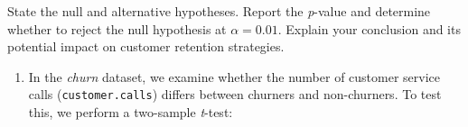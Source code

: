 \documentclass[
  11pt,
]{book}
\makeatletter
\newenvironment{Shaded}{}{}
\newcommand{\AttributeTok}[1]{#1}
\newcommand{\DecValTok}[1]{#1}
\newcommand{\FloatTok}[1]{#1}
\newcommand{\FunctionTok}[1]{#1}
\newcommand{\NormalTok}[1]{#1}
\newcommand{\OtherTok}[1]{\textcolor[rgb]{0.39,0.39,0.39}{#1}}
\newcommand{\SpecialCharTok}[1]{\textcolor[rgb]{0.39,0.39,0.39}{#1}}
\newcommand{\StringTok}[1]{\textcolor[rgb]{0.39,0.39,0.39}{#1}}
\providecommand{\tightlist}{%
  \setlength{\itemsep}{0pt}\setlength{\parskip}{0pt}}
\newenvironment{kframe}{%
\medskip{}
\setlength{\fboxsep}{.8em}
 \def\at@end@of@kframe{}%
 \ifinner\ifhmode%
  \def\at@end@of@kframe{\end{minipage}}%
  \begin{minipage}{\columnwidth}%
 \fi\fi%
 \def\FrameCommand##1{\hskip\@totalleftmargin \hskip-\fboxsep
 \colorbox{shadecolor}{##1}\hskip-\fboxsep
     \hskip-\linewidth \hskip-\@totalleftmargin \hskip\columnwidth}%
 \MakeFramed {\advance\hsize-\width
   \@totalleftmargin\z@ \linewidth\hsize
   \@setminipage}}%
 {\par\unskip\endMakeFramed%
 \at@end@of@kframe}
\renewenvironment{Shaded}{\begin{kframe}}{\end{kframe}}
\theoremstyle{definition}
\theoremstyle{definition}
\theoremstyle{definition}
\theoremstyle{definition}
\theoremstyle{remark}
\makeatother
\begin{document}
\begin{Shaded}
\end{Shaded}

State the null and alternative hypotheses. Report the \emph{p}-value and determine whether to reject the null hypothesis at \(\alpha=0.01\). Explain your conclusion and its potential impact on customer retention strategies.

\begin{enumerate}
\def\labelenumi{\arabic{enumi}.}
\setcounter{enumi}{13}
\tightlist
\item
  In the \emph{churn} dataset, we examine whether the number of customer service calls (\texttt{customer.calls}) differs between churners and non-churners. To test this, we perform a two-sample \emph{t}-test:
\end{enumerate}
\end{document}
